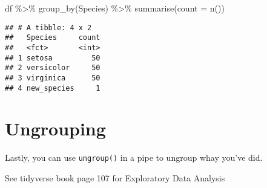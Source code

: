\documentclass[
]{book}
\newenvironment{Shaded}{\begin{snugshade}}{\end{snugshade}}
\newcommand{\AttributeTok}[1]{\textcolor[rgb]{0.77,0.63,0.00}{#1}}
\newcommand{\FunctionTok}[1]{\textcolor[rgb]{0.00,0.00,0.00}{#1}}
\newcommand{\NormalTok}[1]{#1}
\newcommand{\SpecialCharTok}[1]{\textcolor[rgb]{0.00,0.00,0.00}{#1}}
\begin{document}
\begin{Shaded}
\begin{Highlighting}[]
\NormalTok{df }\SpecialCharTok{\%\textgreater{}\%} 
  \FunctionTok{group\_by}\NormalTok{(Species) }\SpecialCharTok{\%\textgreater{}\%} 
  \FunctionTok{summarise}\NormalTok{(}\AttributeTok{count =} \FunctionTok{n}\NormalTok{())}
\end{Highlighting}
\end{Shaded}

\begin{verbatim}
## # A tibble: 4 x 2
##   Species     count
##   <fct>       <int>
## 1 setosa         50
## 2 versicolor     50
## 3 virginica      50
## 4 new_species     1
\end{verbatim}

\hypertarget{ungrouping}{%
\section{Ungrouping}\label{ungrouping}}

Lastly, you can use \texttt{ungroup()} in a pipe to ungroup whay you've did.

See tidyverse book page 107 for Exploratory Data Analysis

  
\end{document}

